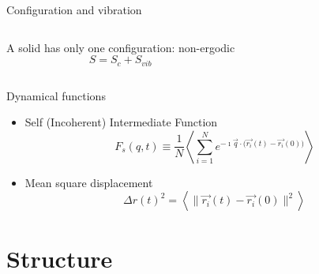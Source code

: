 \begin{frame}{Configuration and vibration}
	\begin{columns}
	\def\svgwidth{\columnwidth}
	\centering\small{}
	
	A solid has only one configuration: non-ergodic
	\[ S = S_c + S_{vib} \]
	\end{columns}
\end{frame}

\begin{frame}{Dynamical functions}
	\begin{itemize}
		\item Self (Incoherent) Intermediate Function
		\[ F_s(q,t) \equiv \frac{1}{N} \left\langle\sum_{i=1}^N e^{-\imath\vec{q}\cdot\bigl(\vec{r_i}(t)-\vec{r_i}(0)\bigr)}\right\rangle \]
		\item Mean square displacement
		\[ \Delta r(t)^2 = \left\langle\| \vec{r_i}(t)-\vec{r_i}(0)\|^2\right\rangle \]
	\end{itemize}
\end{frame}

\section{Structure}

